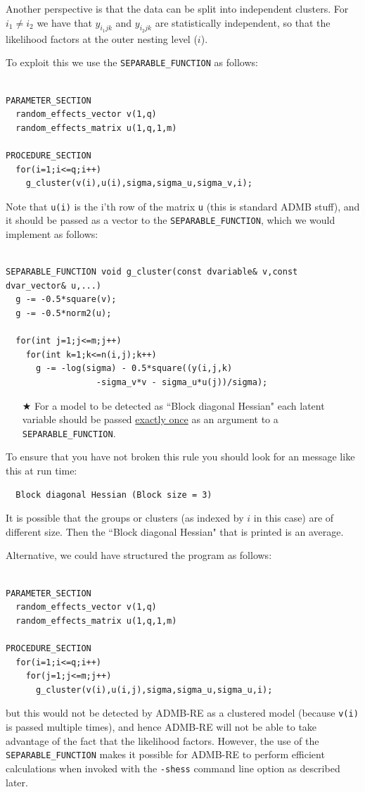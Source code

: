 \documentclass[12pt,letter,reqno]{book}
\begin{document}
Another perspective is that the data can be split into independent clusters.
For $i_1\neq i_2$ we have that $y_{i_1jk}$ and $y_{i_2jk}$ are statistically independent,
so that the likelihood factors at the outer nesting level ($i$). 

To exploit this we use the \texttt{SEPARABLE\_FUNCTION} as follows:
\begin{lstlisting}	

PARAMETER_SECTION
  random_effects_vector v(1,q)
  random_effects_matrix u(1,q,1,m)

PROCEDURE_SECTION
  for(i=1;i<=q;i++)
    g_cluster(v(i),u(i),sigma,sigma_u,sigma_v,i);

\end{lstlisting}
Note that \texttt{u(i)} is the i'th row of the matrix \texttt{u} (this is standard ADMB stuff),
and it should be passed as a vector to the \texttt{SEPARABLE\_FUNCTION}, which
we would implement as follows:
\begin{lstlisting}	

SEPARABLE_FUNCTION void g_cluster(const dvariable& v,const dvar_vector& u,...)
  g -= -0.5*square(v);
  g -= -0.5*norm2(u);

  for(int j=1;j<=m;j++)
    for(int k=1;k<=n(i,j);k++)
      g -= -log(sigma) - 0.5*square((y(i,j,k)
                  -sigma_v*v - sigma_u*u(j))/sigma);

\end{lstlisting}
\begin{itemize}
\item[$\bigstar$] For a model to be detected as ``Block diagonal Hessian" each latent variable
          should be passed \underline{exactly once} as an argument to a \texttt{SEPARABLE\_FUNCTION}.
\end{itemize}
To ensure that you have not broken this rule you should look for an message like this at run time:
\begin{lstlisting}
  Block diagonal Hessian (Block size = 3)
\end{lstlisting}
It is possible that the groups or clusters (as indexed by $i$ in this case) are of different size.
Then the ``Block diagonal Hessian" that is printed is an average.


Alternative, we could have structured the program as follows:
\begin{lstlisting}	

PARAMETER_SECTION
  random_effects_vector v(1,q)
  random_effects_matrix u(1,q,1,m)

PROCEDURE_SECTION
  for(i=1;i<=q;i++)
    for(j=1;j<=m;j++)
      g_cluster(v(i),u(i,j),sigma,sigma_u,sigma_u,i);

\end{lstlisting}
but this would not be detected by ADMB-RE as a clustered model (because
\texttt{v(i)} is passed multiple times), and hence
ADMB-RE will not be able to take advantage of the fact that the likelihood
factors. However, the use of the \texttt{SEPARABLE\_FUNCTION} makes
it possible for ADMB-RE to perform efficient calculations when invoked
with the \texttt{-shess}  command line option as described later.
\end{document}

